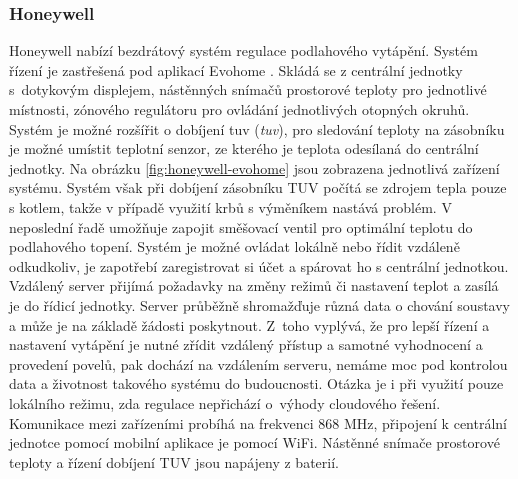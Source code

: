 \subsubsection{Honeywell}
Honeywell nabízí bezdrátový systém regulace podlahového vytápění. Systém řízení je zastřešená pod aplikací Evohome \cite{honeywell-evohome-stranky}. Skládá se z centrální jednotky s~dotykovým displejem, nástěnných snímačů prostorové teploty pro jednotlivé místnosti, zónového regulátoru pro ovládání jednotlivých otopných okruhů. Systém je možné rozšířit o dobíjení \acrshort{tuv} (\textit{\acrlong{tuv}}), pro sledování teploty na zásobníku je možné umístit teplotní senzor, ze kterého je teplota odesílaná do centrální jednotky. Na obrázku \ref{fig:honeywell-evohome} jsou zobrazena jednotlivá zařízení systému. Systém však při dobíjení zásobníku TUV počítá se zdrojem tepla pouze s kotlem, takže v případě využití krbů s výměníkem nastává problém. V neposlední řadě umožňuje zapojit směšovací ventil pro optimální teplotu do podlahového topení. Systém je možné ovládat lokálně nebo řídit vzdáleně odkudkoliv, je zapotřebí zaregistrovat si účet a spárovat ho s  centrální jednotkou. Vzdálený server přijímá požadavky na změny režimů či nastavení teplot a zasílá je do řídicí jednotky. Server průběžně shromažďuje různá data o chování soustavy a může je na základě žádosti poskytnout. Z~toho vyplývá, že pro lepší řízení a nastavení vytápění je nutné zřídit vzdálený přístup a samotné vyhodnocení a provedení povelů, pak dochází na vzdálením serveru, nemáme moc pod kontrolou data a životnost takového systému do budoucnosti. Otázka je i při využití pouze lokálního režimu, zda regulace nepřichází o~výhody cloudového řešení. Komunikace mezi zařízeními probíhá na frekvenci 868 MHz, připojení k centrální jednotce pomocí mobilní aplikace je pomocí WiFi. Nástěnné snímače prostorové teploty a řízení dobíjení TUV jsou napájeny z baterií.

\newpage

